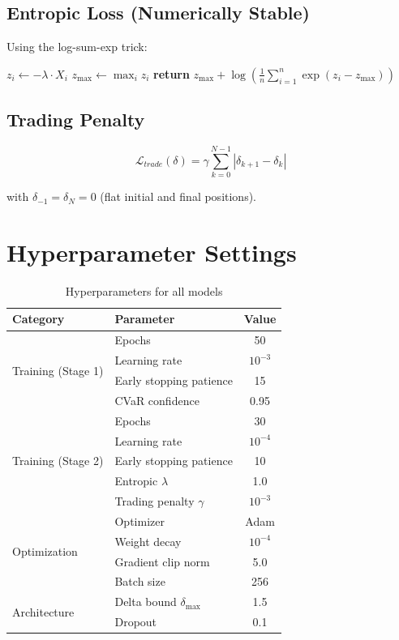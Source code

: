\subsection{Entropic Loss (Numerically Stable)}

Using the log-sum-exp trick:

\begin{algorithmic}
\STATE $z_i \gets -\lambda \cdot X_i$
\STATE $z_{\max} \gets \max_i z_i$
\STATE \textbf{return} $z_{\max} + \log\left(\frac{1}{n}\sum_{i=1}^n \exp(z_i - z_{\max})\right)$
\end{algorithmic}

\subsection{Trading Penalty}

\begin{equation}
    \mathcal{L}_{trade}(\delta) = \gamma \sum_{k=0}^{N-1} |\delta_{k+1} - \delta_k|
\end{equation}

with $\delta_{-1} = \delta_N = 0$ (flat initial and final positions).

\section{Hyperparameter Settings}
\label{app:hyperparams}

\begin{table}[h]
\centering
\caption{Hyperparameters for all models}
\begin{tabular}{llc}
\toprule
\textbf{Category} & \textbf{Parameter} & \textbf{Value} \\
\midrule
\multirow{4}{*}{Training (Stage 1)} 
& Epochs & 50 \\
& Learning rate & $10^{-3}$ \\
& Early stopping patience & 15 \\
& CVaR confidence & 0.95 \\
\midrule
\multirow{5}{*}{Training (Stage 2)} 
& Epochs & 30 \\
& Learning rate & $10^{-4}$ \\
& Early stopping patience & 10 \\
& Entropic $\lambda$ & 1.0 \\
& Trading penalty $\gamma$ & $10^{-3}$ \\
\midrule
\multirow{4}{*}{Optimization} 
& Optimizer & Adam \\
& Weight decay & $10^{-4}$ \\
& Gradient clip norm & 5.0 \\
& Batch size & 256 \\
\midrule
\multirow{2}{*}{Architecture} 
& Delta bound $\delta_{\max}$ & 1.5 \\
& Dropout & 0.1 \\
\bottomrule
\end{tabular}
\end{table}

